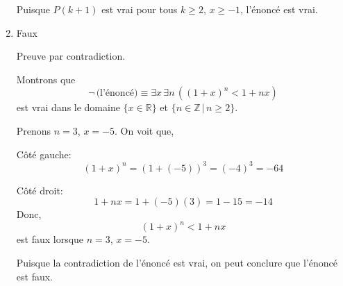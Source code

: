 \documentclass[12pt]{book}
\begin{document}
\begin{enumerate}
    Puisque $P(k+1)$ est vrai pour tous $k \geq 2$, $x \geq -1$, l'énoncé est vrai.
    
    \newpage
    \item Faux
    
    Preuve par contradiction.
    
    Montrons que $$\neg \, \text{(l'énoncé)} \equiv \exists x \, \exists n \, \left((1+x)^n < 1 + nx\right)$$ est vrai dans le domaine $\{x \in \mathbb{R}\}$ et $\{n \in \mathbb{Z} \,|\, n \geq 2\}$.
    
    Prenons $n = 3$, $x = -5$. On voit que,
    
    Côté gauche:
    $$(1+x)^n = (1+(-5))^3 = (-4)^3 = -64$$
    
    Côté droit:
    $$1+nx = 1+(-5)(3) = 1 - 15 = -14$$
    Donc, $$(1+x)^n < 1 + nx$$ est faux lorsque $n = 3$, $x = -5$.
    
    Puisque la contradiction de l'énoncé est vrai, on peut conclure que l'énoncé est faux.
    
    
    
    


\end{enumerate}
\end{document}
